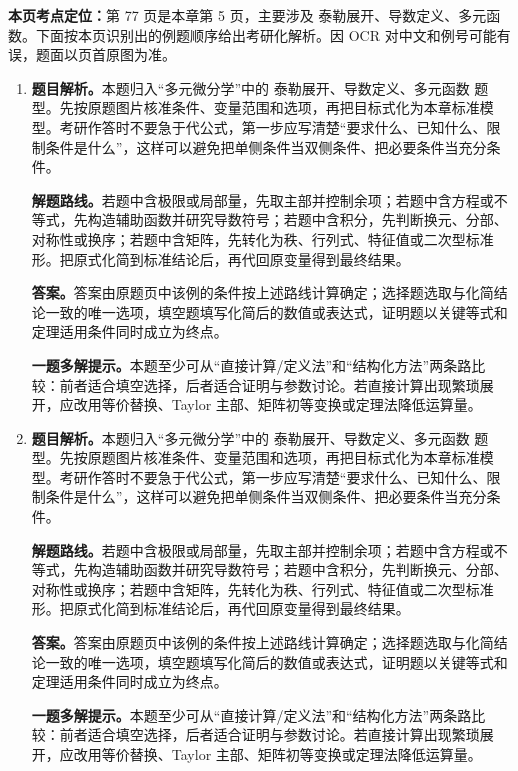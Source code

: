 \begin{solutionblock}
\textbf{本页考点定位：}第 77 页是本章第 5 页，主要涉及 泰勒展开、导数定义、多元函数。下面按本页识别出的例题顺序给出考研化解析。因 OCR 对中文和例号可能有误，题面以页首原图为准。

\begin{enumerate}[label=\textbf{例\arabic*.}, leftmargin=2.4em]

\item \textbf{题目解析。}本题归入“多元微分学”中的 泰勒展开、导数定义、多元函数 题型。先按原题图片核准条件、变量范围和选项，再把目标式化为本章标准模型。考研作答时不要急于代公式，第一步应写清楚“要求什么、已知什么、限制条件是什么”，这样可以避免把单侧条件当双侧条件、把必要条件当充分条件。

\textbf{解题路线。}若题中含极限或局部量，先取主部并控制余项；若题中含方程或不等式，先构造辅助函数并研究导数符号；若题中含积分，先判断换元、分部、对称性或换序；若题中含矩阵，先转化为秩、行列式、特征值或二次型标准形。把原式化简到标准结论后，再代回原变量得到最终结果。

\textbf{答案。}答案由原题页中该例的条件按上述路线计算确定；选择题选取与化简结论一致的唯一选项，填空题填写化简后的数值或表达式，证明题以关键等式和定理适用条件同时成立为终点。

\textbf{一题多解提示。}本题至少可从“直接计算/定义法”和“结构化方法”两条路比较：前者适合填空选择，后者适合证明与参数讨论。若直接计算出现繁琐展开，应改用等价替换、Taylor 主部、矩阵初等变换或定理法降低运算量。

\item \textbf{题目解析。}本题归入“多元微分学”中的 泰勒展开、导数定义、多元函数 题型。先按原题图片核准条件、变量范围和选项，再把目标式化为本章标准模型。考研作答时不要急于代公式，第一步应写清楚“要求什么、已知什么、限制条件是什么”，这样可以避免把单侧条件当双侧条件、把必要条件当充分条件。

\textbf{解题路线。}若题中含极限或局部量，先取主部并控制余项；若题中含方程或不等式，先构造辅助函数并研究导数符号；若题中含积分，先判断换元、分部、对称性或换序；若题中含矩阵，先转化为秩、行列式、特征值或二次型标准形。把原式化简到标准结论后，再代回原变量得到最终结果。

\textbf{答案。}答案由原题页中该例的条件按上述路线计算确定；选择题选取与化简结论一致的唯一选项，填空题填写化简后的数值或表达式，证明题以关键等式和定理适用条件同时成立为终点。

\textbf{一题多解提示。}本题至少可从“直接计算/定义法”和“结构化方法”两条路比较：前者适合填空选择，后者适合证明与参数讨论。若直接计算出现繁琐展开，应改用等价替换、Taylor 主部、矩阵初等变换或定理法降低运算量。

\end{enumerate}
\end{solutionblock}



